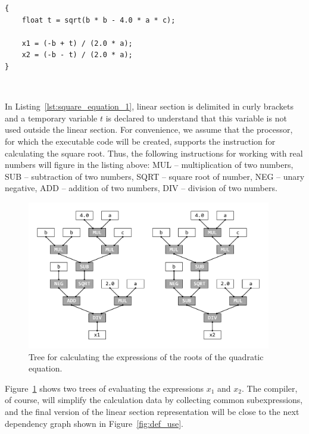 \documentclass[
11pt,%
tightenlines,%
twoside,%
onecolumn,%
nofloats,%
nobibnotes,%
nofootinbib,%
superscriptaddress,%
noshowpacs,%
centertags]%
{revtex4}
\begin{document}
\begin{lstlisting}[caption={The code block for calculating the roots of the quadratic equation.},label={lst:square_equation_1}]
{
    float t = sqrt(b * b - 4.0 * a * c);
    
    x1 = (-b + t) / (2.0 * a);
    x2 = (-b - t) / (2.0 * a);
}
\end{lstlisting}

\

In Listing~\ref{lst:square_equation_1}, linear section is delimited in curly brackets and a temporary variable $t$ is declared to understand that this variable is not used outside the linear section. For convenience, we assume that the processor, for which the executable code will be created, supports the instruction for calculating the square root. Thus, the following instructions for working with real numbers will figure in the listing above: MUL -- multiplication of two numbers, SUB -- subtraction of two numbers, SQRT -- square root of number, NEG -- unary negative, ADD -- addition of two numbers, DIV -- division of two numbers.

\begin{figure}[h]
\setcaptionmargin{5mm}
\includegraphics[width=0.95\textwidth]{pics/square_equation_calculation_tree.pdf}
\caption{Tree for calculating the expressions of the roots of the quadratic equation.}\label{fig:square_equation_calculation_tree}
\end{figure}

Figure~\ref{fig:square_equation_calculation_tree} shows two trees of evaluating the expressions $x_1$ and $x_2$. The compiler, of course, will simplify the calculation data by collecting common subexpressions, and the final version of the linear section representation will be close to the next dependency graph shown in Figure~\ref{fig:def_use}.
\end{document}
